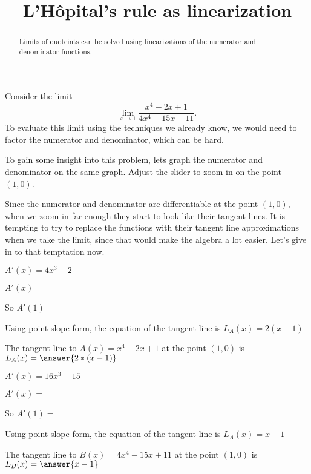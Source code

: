 \documentclass{ximera}
\title[ Dig-In:]{L'H\^{o}pital's rule as linearization}
\begin{document}
\begin{abstract}
   Limits of quoteints can be solved using linearizations of the
   numerator and denominator functions.
\end{abstract}
\maketitle

Consider the limit 
\[
\lim_{x \to 1} \frac{x^4-2x+1}{4x^4 - 15x +11}.
\]  
To evaluate this limit using the techniques we already know, we would
need to factor the numerator and denominator, which can be hard.

To gain some insight into this problem, lets graph the numerator and
denominator on the same graph. Adjust the slider to zoom in on the
point $(1,0)$.


Since the numerator and denominator are differentiable at the point
$(1,0)$, when we zoom in far enough they start to look like their
tangent lines.  It is tempting to try to replace the functions with
their tangent line approximations when we take the limit, since that
would make the algebra a lot easier.  Let's give in to that temptation
now.

\begin{question}
  \begin{hint}
    \begin{hint}
      $A'(x) = 4x^3-2$
    \end{hint}
    $A'(x)=$
  \end{hint}
  \begin{hint}
    So $A'(1)=$
  \end{hint}
  \begin{hint}
    Using point slope form, the equation of the tangent line is $L_A(x) = 2(x-1)$
  \end{hint}
  
  The tangent line to $A(x) = x^4-2x+1$ at the point $(1,0)$ is $L_A(x) =\answer{2*(x-1)}$
\end{question}

\begin{question}
  \begin{hint}
    \begin{hint}
      $A'(x) = 16x^3-15$
      \end{hint}
    $A'(x)=$
  \end{hint}
  \begin{hint}
    So $A'(1)=$
  \end{hint}
  \begin{hint}
    Using point slope form, the equation of the tangent line is $L_A(x) = x-1$
  \end{hint}
  The tangent line to $B(x) = 4x^4-15x+11$ at the point $(1,0)$ is $ L_B(x)= \answer{x-1}$
\end{question}
\end{document}

